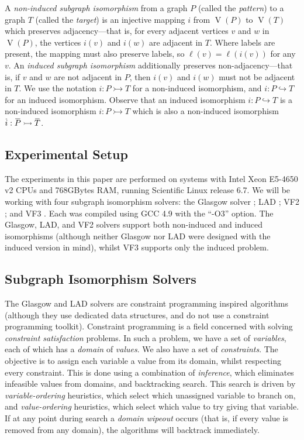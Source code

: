 \documentclass[twoside,11pt]{article}
\newcommand{\citep}[1]{\cite{#1}}
\newcommand{\shortoverline}[1]{\mkern 1.5mu\overline{\mkern-1.5mu#1\mkern-1.5mu}\mkern 1.5mu}
\begin{document}
A \emph{non-induced subgraph isomorphism} from a graph $P$ (called the \emph{pattern}) to a graph
$T$ (called the \emph{target}) is an injective mapping $i$ from $\operatorname{V}(P)$ to
$\operatorname{V}(T)$ which preserves adjacency---that is, for every adjacent vertices $v$ and $w$ in
$\operatorname{V}(P)$, the vertices $i(v)$ and $i(w)$ are adjacent in $T$. Where labels are present,
the mapping must also preserve labels, so $\ell(v) = \ell(i(v))$ for any $v$. An \emph{induced
subgraph isomorphism} additionally preserves non-adjacency---that is, if $v$ and $w$ are not
adjacent in $P$, then $i(v)$ and $i(w)$ must not be adjacent in $T$. We use the notation $i : P
\rightarrowtail T$ for a non-induced isomorphism, and $i : P \hookrightarrow T$ for an induced
isomorphism. Observe that an induced isomorphism $i : P \hookrightarrow T$ is a non-induced
isomorphism $i : P \rightarrowtail T$ which is also a non-induced isomorphism $\shortoverline{i} :
\shortoverline{P} \rightarrowtail \shortoverline{T}$.

\subsection{Experimental Setup}

The experiments in this paper are performed on systems with Intel Xeon E5-4650 v2 CPUs and 768GBytes
RAM, running Scientific Linux release 6.7. We will be working with four subgraph isomorphism
solvers: the Glasgow solver \citep{DBLP:conf/cp/McCreeshP15,DBLP:conf/lion/KotthoffMS16}; LAD
\citep{DBLP:journals/ai/Solnon10}; VF2 \citep{DBLP:journals/pami/CordellaFSV04}; and VF3
\citep{DBLP:conf/gbrpr/CarlettiFSV17}. Each was compiled using GCC 4.9 with the ``-O3'' option.
The Glasgow, LAD, and VF2 solvers support both non-induced and induced isomorphisms (although
neither Glasgow nor LAD were designed with the induced version in mind), whilst VF3 supports only
the induced problem.

\subsection{Subgraph Isomorphism Solvers}

The Glasgow and LAD solvers are constraint programming inspired algorithms (although they use
dedicated data structures, and do not use a constraint programming toolkit). Constraint programming
is a field concerned with solving \emph{constraint satisfaction} problems. In such a problem, we
have a set of \emph{variables}, each of which has a \emph{domain} of \emph{values}. We also have a
set of \emph{constraints}. The objective is to assign each variable a value from its domain, whilst
respecting every constraint. This is done using a combination of \emph{inference}, which eliminates
infeasible values from domains, and backtracking search. This search is driven by
\emph{variable-ordering} heuristics, which select which unassigned variable to branch on, and
\emph{value-ordering} heuristics, which select which value to try giving that variable. If at any
point during search a \emph{domain wipeout} occurs (that is, if every value is removed from any
domain), the algorithms will backtrack immediately.
\end{document}
